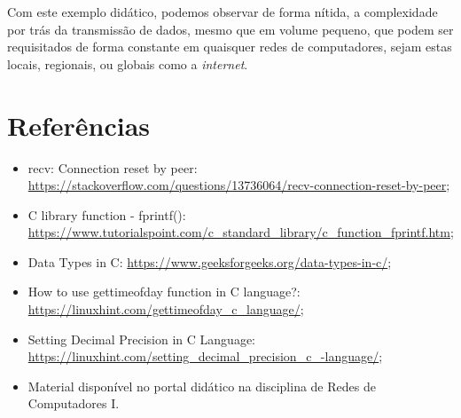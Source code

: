 \documentclass[a4paper, 12pt]{article}
\begin{document}
Com este exemplo didático, podemos observar de forma nítida, a complexidade por trás da transmissão de dados, mesmo que em volume pequeno, que podem ser requisitados de forma constante em quaisquer redes de computadores, sejam estas locais, regionais, ou globais como a \emph{internet}. 

\section*{Referências}

\begin{itemize}
    \item recv: Connection reset by peer: \url{https://stackoverflow.com/questions/13736064/recv-connection-reset-by-peer};
    \item C library function - fprintf(): \url{https://www.tutorialspoint.com/c_standard_library/c_function_fprintf.htm};
    \item Data Types in C: \url{https://www.geeksforgeeks.org/data-types-in-c/};
    \item How to use gettimeofday function in C language?: \url{https://linuxhint.com/gettimeofday_c_language/};
    \item Setting Decimal Precision in C Language: \url{https://linuxhint.com/setting_decimal_precision_c_-language/};
    \item Material disponível no portal didático na disciplina de Redes de Computadores I.
\end{itemize}
\end{document}
